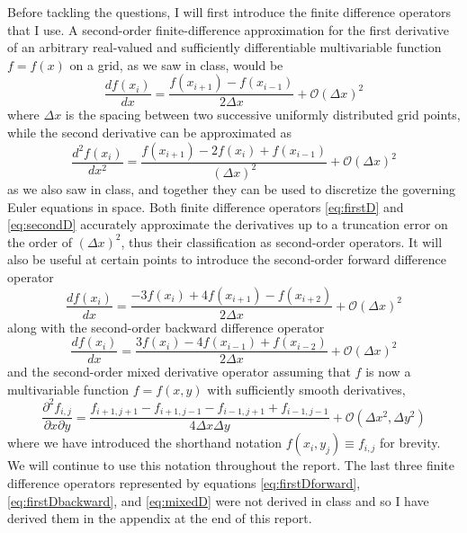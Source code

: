 \documentclass[11pt]{article}
\begin{document}
Before tackling the questions, I will first introduce the finite difference operators that I use. A second-order finite-difference approximation for the first derivative of an arbitrary real-valued and sufficiently differentiable multivariable function $f = f(x)$ on a grid, as we saw in class, would be 
\begin{equation} \label{eq:firstD}
\frac{df(x_i)}{dx} = \frac{f(x_{i+1}) - f(x_{i-1})}{2\Delta x} + \mathcal{O}(\Delta x)^2
\end{equation}
where $\Delta x$ is the spacing between two successive uniformly distributed grid points, while the second derivative can be approximated as
\begin{equation} \label{eq:secondD}
\frac{d^2 f(x_i)}{dx^2} = \frac{f(x_{i+1}) - 2f(x_i) + f(x_{i-1})}{(\Delta x)^2} + \mathcal{O}(\Delta x)^2
\end{equation}
as we also saw in class, and together they can be used to discretize the governing Euler equations in space. Both finite difference operators \eqref{eq:firstD} and \eqref{eq:secondD} accurately approximate the derivatives up to a truncation error on the order of $(\Delta x)^2$, thus their classification as second-order operators. It will also be useful at certain points to introduce the second-order forward difference operator
\begin{equation} \label{eq:firstDforward}
\frac{df(x_i)}{dx} = \frac{-3f(x_{i}) + 4f(x_{i+1}) - f(x_{i+2})}{2\Delta x} + \mathcal{O}(\Delta x)^2
\end{equation}
along with the second-order backward difference operator
\begin{equation} \label{eq:firstDbackward}
\frac{df(x_i)}{dx} = \frac{3f(x_{i}) - 4f(x_{i-1}) + f(x_{i-2})}{2\Delta x} + \mathcal{O}(\Delta x)^2
\end{equation}
and the second-order mixed derivative operator assuming that $f$ is now a multivariable function $f = f(x,y)$ with sufficiently smooth derivatives,
\begin{equation} \label{eq:mixedD}
\frac{\partial^2 f_{i,j}}{\partial x \partial y} = \frac{f_{i+1,j+1} - f_{i+1,j-1} - f_{i-1,j+1} + f_{i-1,j-1}}{4\Delta x \Delta y} + \mathcal{O}(\Delta x^2, \Delta y^2)
\end{equation}
where we have introduced the shorthand notation $f(x_i,y_j) \equiv f_{i,j}$ for brevity. We will continue to use this notation throughout the report. The last three finite difference operators represented by equations \eqref{eq:firstDforward}, \eqref{eq:firstDbackward}, and \eqref{eq:mixedD} were not derived in class and so I have derived them in the appendix at the end of this report. \\
\end{document}
